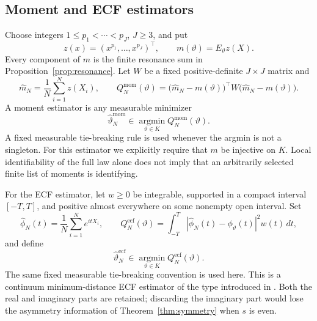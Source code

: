 \documentclass[11pt]{amsart}
\numberwithin{equation}{section}\setcounter{tocdepth}{3}\setcounter{secnumdepth}{3}
\begin{document}
\subsection{Moment and ECF estimators}\label{subsec:moment_ecf_estimators}
Choose integers $1\le p_1<\cdots<p_J$, $J\ge3$, and put
\begin{equation}
 z(x)=(x^{p_1},\ldots,x^{p_J})^\top,
 \qquad m(\vartheta)=E_\vartheta z(X).
 \label{eq:moment_vector_definition}
\end{equation}
Every component of $m$ is the finite resonance sum in
Proposition~\ref{prop:resonance}.  Let $W$ be a fixed positive-definite $J\times J$
matrix and
\begin{equation}
 \widehat m_N=\frac1N\sum_{i=1}^Nz(X_i),\qquad
 Q_N^{\mathrm{mom}}(\vartheta)
 =\bigl(\widehat m_N-m(\vartheta)\bigr)^\top
 W\bigl(\widehat m_N-m(\vartheta)\bigr).
 \label{eq:moment_objective}
\end{equation}
A moment estimator is any measurable minimizer
\begin{equation}
 \widehat\vartheta_N^{\mathrm{mom}}
 \in\operatorname*{argmin}_{\vartheta\in K}Q_N^{\mathrm{mom}}(\vartheta).
 \label{eq:moment_estimator}
\end{equation}
A fixed measurable tie-breaking rule is used whenever the argmin is not a singleton.
For this estimator we explicitly require that $m$ be injective on $K$.  Local
identifiability of the full law alone does not imply that an arbitrarily selected finite
list of moments is identifying.

For the ECF estimator, let $w\ge0$ be integrable, supported in a compact interval
$[-T,T]$, and positive almost everywhere on some nonempty open interval.  Set
\begin{equation}
 \widehat\phi_N(t)=\frac1N\sum_{i=1}^Ne^{itX_i},
 \qquad
 Q_N^{\mathrm{ecf}}(\vartheta)
 =\int_{-T}^T|\widehat\phi_N(t)-\phi_\vartheta(t)|^2w(t)\,dt,
 \label{eq:ecf_objective}
\end{equation}
and define
\begin{equation}
 \widehat\vartheta_N^{\mathrm{ecf}}
 \in\operatorname*{argmin}_{\vartheta\in K}Q_N^{\mathrm{ecf}}(\vartheta).
 \label{eq:ecf_estimator}
\end{equation}
The same fixed measurable tie-breaking convention is used here.
This is a continuum minimum-distance ECF estimator of the type introduced in
\cite{FeuervergerMcDunnough1981,CarrascoFlorens2000}.  Both the real and imaginary parts
are retained; discarding the imaginary part would lose the asymmetry information of
Theorem~\ref{thm:symmetry} when $s$ is even.
\end{document}
